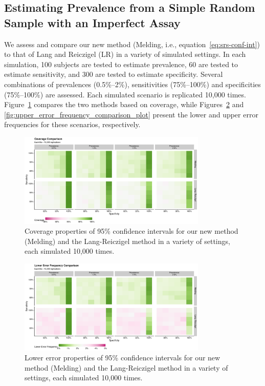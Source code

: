 \documentclass[AMA,STIX1COL]{WileyNJD-v2}
\begin{document}
\subsection{Estimating Prevalence from a Simple Random Sample with an Imperfect Assay}

We assess and compare our new method (Melding, i.e., equation~\ref{eq:srs-conf-int}) to that of Lang and Reiczigel (LR) in a variety of simulated settings.
In each simulation, 100 subjects are tested to estimate prevalence, 60 are tested to estimate sensitivity, and 300 are tested to estimate specificity.
Several combinations of prevalences (0.5\%--2\%), sensitivities (75\%--100\%) and specificities (75\%--100\%) are assessed.
Each simulated scenario is replicated 10,000 times.
Figure~\ref{fig:coverage_comparison_plot} compares the two methods based on coverage, while Figures~\ref{fig:lower_error_frequency_comparison_plot} and \ref{fig:upper_error_frequency_comparison_plot} present the lower and upper error frequencies for these scenarios, respectively.

\begin{figure}
    \centering
    \includegraphics[width=0.8\textwidth]{figures/simple_coverage_comparison_plot.pdf}
    \caption{Coverage properties of 95\% confidence intervals for our new method (Melding) and the Lang-Reiczigel method in a variety of settings, each simulated 10,000 times.}
    \label{fig:coverage_comparison_plot}
\end{figure}

\begin{figure}
    \centering
    \includegraphics[width=0.8\textwidth]{figures/simple_lower_error_frequency_comparison_plot.pdf}
    \caption{Lower error properties of 95\% confidence intervals for our new method (Melding) and the Lang-Reiczigel method in a variety of settings, each simulated 10,000 times.}
    \label{fig:lower_error_frequency_comparison_plot}
\end{figure}
\end{document}
